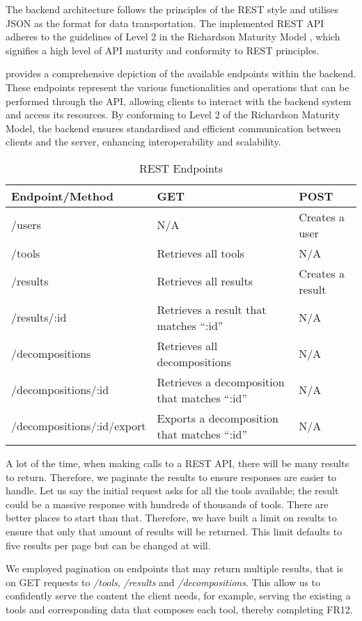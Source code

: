 The backend architecture follows the principles of the REST style and utilises
JSON as the format for data transportation. The implemented REST API adheres to
the guidelines of Level 2 in the Richardson Maturity Model
, which signifies a high level of API
maturity and conformity to REST principles.

 provides a comprehensive depiction of the available
endpoints within the backend. These endpoints represent the various
functionalities and operations that can be performed through the API, allowing
clients to interact with the backend system and access its resources. By
conforming to Level 2 of the Richardson Maturity Model, the backend ensures
standardised and efficient communication between clients and the server,
enhancing interoperability and scalability.

\begin{table}[!htb] \caption{REST Endpoints} \label{tab:rest_endpoints}
  \begin{center}
    \begin{tabular}[c]{p{12em}|p{12em}|p{12em}}
      \textbf{Endpoint/Method} &
      \textbf{GET} &
      \textbf{POST} \\
      \hline {/users} & N/A & Creates a user \\
      \hline {/tools} & Retrieves all tools & N/A \\
      \hline {/results} & Retrieves all results & Creates a result \\
      \hline {/results/:id} & Retrieves a result that matches ``:id'' & N/A \\
      \hline {/decompositions} & Retrieves all decompositions & N/A \\
      \hline {/decompositions/:id} & Retrieves a decomposition that matches ``:id'' & N/A \\
      \hline {/decompositions/:id/export} & Exports a decomposition that matches ``:id'' & N/A \\
    \end{tabular}
  \end{center}
\end{table}

A lot of the time, when making calls to a REST API, there will be many results
to return. Therefore, we paginate the results to ensure responses are easier to
handle. Let us say the initial request asks for all the tools available; the
result could be a massive response with hundreds of thousands of tools. There
are better places to start than that. Therefore, we have built a limit on
results to ensure that only that amount of results will be returned. This limit
defaults to five results per page but can be changed at will.

We employed pagination on endpoints that may return multiple results, that is
on GET requests to \textit{/tools}, \textit{/results} and
\textit{/decompositions}. This allow us to confidently serve the content the
client needs, for example, serving the existing a tools and corresponding data
that composes each tool, thereby completing FR12.
